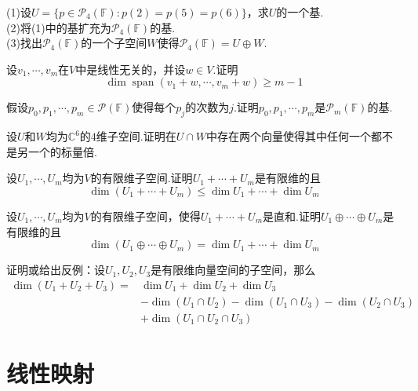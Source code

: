 \documentclass[lang=cn, zihao=5]{elegantbook}
\newcommand{\C}{\mathbb{C}}
\newcommand{\F}{\mathbb{F}}
\DeclareMathOperator{\spn}{span}
\begin{document}
\begin{exercise}
	(1)设$U=\{ p \in \mathcal{P}_{4} (\F) : p(2)=p(5)=p(6) \}$，求$U$的一个基. \\
	(2)将(1)中的基扩充为$\mathcal{P}_{4} (\F)$的基. \\
	(3)找出$\mathcal{P}_{4} (\F)$的一个子空间$W$使得$\mathcal{P}_{4} (\F) = U \oplus W$.
\end{exercise}

\begin{exercise}
	设$v_1, \cdots ,v_m$在$V$中是线性无关的，并设$w \in V$.证明$$\dim \spn (v_1+w, \cdots ,v_m+w) \geq m-1$$
\end{exercise}

\begin{exercise}
	假设$p_0,p_1, \cdots ,p_m \in \mathcal{P} (\F)$使得每个$p_j$的次数为$j$.证明$p_0,p_1, \cdots ,p_m$是$\mathcal{P}_m (\F)$的基.
\end{exercise}

\begin{exercise}
	设$U$和$W$均为$\C ^{6}$的$4$维子空间.证明在$U \cap W$中存在两个向量使得其中任何一个都不是另一个的标量倍.
\end{exercise}

\begin{exercise}
	设$U_1,\cdots ,U_m$均为$V$的有限维子空间.证明$U_1 + \cdots + U_m$是有限维的且$$\dim (U_1 + \cdots + U_m) \leq \dim U_1 +\cdots + \dim U_m$$
\end{exercise}

\begin{exercise}
	设$U_1,\cdots ,U_m$均为$V$的有限维子空间，使得$U_1 + \cdots + U_m$是直和.证明$U_1 \oplus \cdots \oplus U_m$是有限维的且$$\dim (U_1 \oplus \cdots \oplus U_m) = \dim U_1 +\cdots + \dim U_m$$
\end{exercise}

\begin{exercise}
	证明或给出反例：设$U_1,U_2,U_3$是有限维向量空间的子空间，那么
	\begin{align*}
		\dim (U_1+U_2+U_3) = &\dim U_1 + \dim U_2 + \dim U_3 \\ 
		&- \dim (U_1 \cap U_2) - \dim (U_1 \cap U_3) - \dim (U_2 \cap U_3) \\
		&+ \dim (U_1 \cap U_2 \cap U_3)
	\end{align*}
\end{exercise}

\chapter{线性映射}
\end{document}
